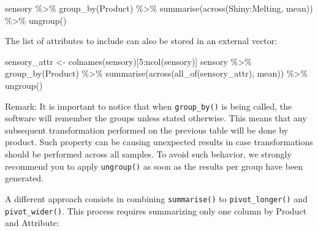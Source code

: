 \documentclass[
]{book}
\newenvironment{Shaded}{\begin{snugshade}}{\end{snugshade}}
\newcommand{\DecValTok}[1]{\textcolor[rgb]{0.00,0.00,0.81}{#1}}
\newcommand{\FunctionTok}[1]{\textcolor[rgb]{0.00,0.00,0.00}{#1}}
\newcommand{\NormalTok}[1]{#1}
\newcommand{\OtherTok}[1]{\textcolor[rgb]{0.56,0.35,0.01}{#1}}
\newcommand{\SpecialCharTok}[1]{\textcolor[rgb]{0.00,0.00,0.00}{#1}}
\begin{document}
\begin{Shaded}
\begin{Highlighting}[]
\NormalTok{sensory }\SpecialCharTok{\%\textgreater{}\%} 
  \FunctionTok{group\_by}\NormalTok{(Product) }\SpecialCharTok{\%\textgreater{}\%} 
  \FunctionTok{summarise}\NormalTok{(}\FunctionTok{across}\NormalTok{(Shiny}\SpecialCharTok{:}\NormalTok{Melting, mean)) }\SpecialCharTok{\%\textgreater{}\%} 
  \FunctionTok{ungroup}\NormalTok{()}
\end{Highlighting}
\end{Shaded}

The list of attributes to include can also be stored in an external vector:

\begin{Shaded}
\begin{Highlighting}[]
\NormalTok{sensory\_attr }\OtherTok{\textless{}{-}} \FunctionTok{colnames}\NormalTok{(sensory)[}\DecValTok{5}\SpecialCharTok{:}\FunctionTok{ncol}\NormalTok{(sensory)]}
\NormalTok{sensory }\SpecialCharTok{\%\textgreater{}\%} 
  \FunctionTok{group\_by}\NormalTok{(Product) }\SpecialCharTok{\%\textgreater{}\%} 
  \FunctionTok{summarise}\NormalTok{(}\FunctionTok{across}\NormalTok{(}\FunctionTok{all\_of}\NormalTok{(sensory\_attr), mean)) }\SpecialCharTok{\%\textgreater{}\%} 
  \FunctionTok{ungroup}\NormalTok{()}
\end{Highlighting}
\end{Shaded}

Remark: It is important to notice that when \texttt{group\_by()} is being called, the software will remember the groups unless stated otherwise. This means that any subsequent transformation performed on the previous table will be done by product. Such property can be causing unexpected results in case transformations should be performed across all samples. To avoid such behavior, we strongly recommend you to apply \texttt{ungroup()} as soon as the results per group have been generated.

A different approach consists in combining \texttt{summarise()} to \texttt{pivot\_longer()} and \texttt{pivot\_wider()}. This process requires summarizing only one column by Product and Attribute:
\end{document}
